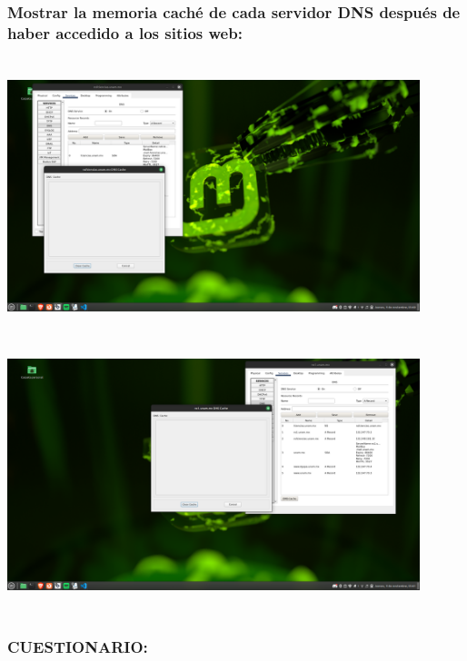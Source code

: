 \documentclass[14pt]{book}
\begin{document}
{\color{red} \subsubsection*{\textbf{Mostrar la memoria caché de cada servidor DNS después de haber accedido a los sitios web:}}}
\vspace{1em}

\includegraphics[width=12cm, height=8cm]{images/CACHE1.png}\\

\includegraphics[width=12cm, height=8cm]{images/CACHE2.png}\\

{\color{red} \subsubsection*{\textbf{CUESTIONARIO:}}}
\vspace{1em}
\end{document}

